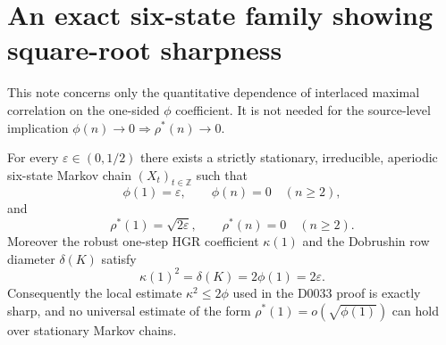 
\section{An exact six-state family showing square-root sharpness}

This note concerns only the quantitative dependence of interlaced maximal
correlation on the one-sided $\phi$ coefficient.  It is not needed for the
source-level implication $\phi(n)\to0\Rightarrow\rho^*(n)\to0$.

\begin{theorem}
For every $\varepsilon\in(0,1/2)$ there exists a strictly stationary,
irreducible, aperiodic six-state Markov chain $(X_t)_{t\in\mathbb Z}$ such
that
\[
  \phi(1)=\varepsilon,\qquad \phi(n)=0\quad(n\ge2),
\]
and
\[
  \rho^*(1)=\sqrt{2\varepsilon},\qquad
  \rho^*(n)=0\quad(n\ge2).
\]
Moreover the robust one-step HGR coefficient $\kappa(1)$ and the Dobrushin
row diameter $\delta(K)$ satisfy
\[
  \kappa(1)^2=\delta(K)=2\phi(1)=2\varepsilon.
\]
Consequently the local estimate $\kappa^2\le 2\phi$ used in the D0033 proof
is exactly sharp, and no universal estimate of the form
$\rho^*(1)=o(\sqrt{\phi(1)})$ can hold over stationary Markov chains.
\end{theorem}

